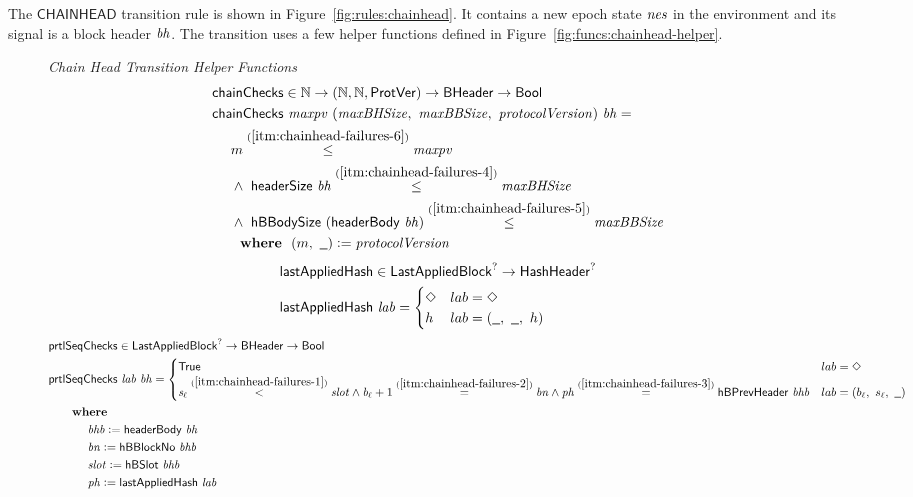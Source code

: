 The $\mathsf{CHAINHEAD}$ transition rule is shown in Figure~\ref{fig:rules:chainhead}.
It contains a new epoch state $\mathit{nes}$ in the environment and its signal is a block
header $\mathit{bh}$.
The transition uses a few helper functions defined in Figure~\ref{fig:funcs:chainhead-helper}.

\begin{figure}[htb]
  \emph{Chain Head Transition Helper Functions}
  \begin{align*}
      & \fun{chainChecks} \in \N \to (\N,\N, \ProtVer) \to \BHeader \to \Bool \\
      & \fun{chainChecks}~\var{maxpv}~(\var{maxBHSize},~\var{maxBBSize},~\var{protocolVersion})~\var{bh} = \\
      & ~~~~ m \overset{(\ref{itm:chainhead-failures-6})}{\leq} \var{maxpv} \\
      & ~~~~ \land~\headerSize{bh} \overset{(\ref{itm:chainhead-failures-4})}{\leq} \var{maxBHSize} \\
      & ~~~~ \land~\hBBodySize{(\headerBody{bh})} \overset{(\ref{itm:chainhead-failures-5})}{\leq} \var{maxBBSize} \\
      & ~~~~ \where (m,~\wcard)\leteq\var{protocolVersion}
  \end{align*}
  \begin{align*}
      & \fun{lastAppliedHash} \in \LastAppliedBlock^? \to \HashHeader^? \\
      & \fun{lastAppliedHash}~\var{lab} =
        \begin{cases}
          \Nothing & lab = \Nothing \\
          h & lab = (\wcard,~\wcard,~h) \\
        \end{cases}
  \end{align*}
  \begin{align*}
      & \fun{prtlSeqChecks} \in \LastAppliedBlock^? \to \BHeader \to \Bool \\
      & \fun{prtlSeqChecks}~\var{lab}~\var{bh} =
        \begin{cases}
          \mathsf{True}
          &
          lab = \Nothing
          \\
          \var{s_\ell} \overset{(\ref{itm:chainhead-failures-1})}{<} \var{slot}
          \land \var{b_\ell} + 1 \overset{(\ref{itm:chainhead-failures-2})}{=} \var{bn}
          \land \var{ph} \overset{(\ref{itm:chainhead-failures-3})}{=} \hBPrevHeader{bhb}
          &
          lab = (b_\ell,~s_\ell,~\wcard) \\
        \end{cases} \\
      & ~~~~\where \\
      & ~~~~~~~~~~\var{bhb} \leteq \headerBody{bh} \\
      & ~~~~~~~~~~\var{bn} \leteq \hBBlockNo{bhb} \\
      & ~~~~~~~~~~\var{slot} \leteq \hBSlot{bhb} \\
      & ~~~~~~~~~~\var{ph} \leteq \lastAppliedHash{lab} \\
  \end{align*}


\end{figure}
